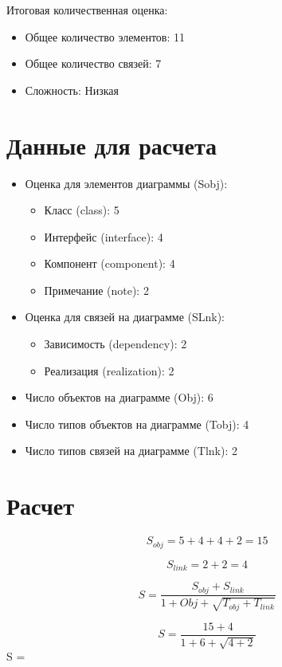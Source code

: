 \documentclass{article}
\begin{document}
Итоговая количественная оценка:
\begin{itemize}
    \item Общее количество элементов: 11
    \item Общее количество связей: 7
    \item Сложность: Низкая
\end{itemize}

\section*{Данные для расчета}

\begin{itemize}
    \item Оценка для элементов диаграммы (Sobj):
    \begin{itemize}
        \item Класс (class): 5
        \item Интерфейс (interface): 4
        \item Компонент (component): 4
        \item Примечание (note): 2
    \end{itemize}
    \item Оценка для связей на диаграмме (SLnk):
    \begin{itemize}
        \item Зависимость (dependency): 2
        \item Реализация (realization): 2
    \end{itemize}
    \item Число объектов на диаграмме (Obj): 6
    \item Число типов объектов на диаграмме (Tobj): 4
    \item Число типов связей на диаграмме (Tlnk): 2
\end{itemize}

\section*{Расчет}

$$S_{obj} = 5 + 4 + 4 + 2 = 15$$

$$S_{link} = 2 + 2 = 4$$

$$S = \frac{S_{obj} + S_{link}}{1 + Obj + \sqrt{T_{obj} + T_{link}}}$$

$$S = \frac{15 + 4}{1 + 6 + \sqrt{4 + 2}} 

$$S \approx {} =  $$
\end{document}

